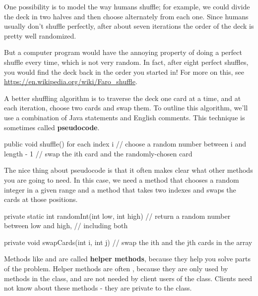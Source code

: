 One possibility is to model the way humans shuffle; for example, we could divide the deck in two halves and then choose alternately from each one.
Since humans usually don't shuffle perfectly, after about seven iterations the order of the deck is pretty well randomized.

But a computer program would have the annoying property of doing a perfect shuffle every time, which is not very random.
In fact, after eight perfect shuffles, you would find the deck back in the order you started in!
For more on this, see \url{https://en.wikipedia.org/wiki/Faro_shuffle}.


A better shuffling algorithm is to traverse the deck one card at a time, and at each iteration, choose two cards and swap them.
To outline this algorithm, we'll use a combination of Java statements and English comments.
This technique is sometimes called {\bf pseudocode}.


\begin{code}
public void shuffle() {
    for each index i {
        // choose a random number between i and length - 1
        // swap the ith card and the randomly-chosen card
    }
}
\end{code}


The nice thing about pseudocode is that it often makes clear what other methods you are going to need.
In this case, we need a method that chooses a random integer in a given range and a method that takes two indexes and swaps the cards at those positions.

\begin{code}
private static int randomInt(int low, int high) {
    // return a random number between low and high, 
    // including both
}

private void swapCards(int i, int j) {
    // swap the ith and the jth cards in the array
}
\end{code}


Methods like  and  are called {\bf helper methods}, because they help you solve parts of the problem.
Helper methods are often , because they are only used by methods in the class, and are not needed by client users of the class. Clients need not know about these methods - they are private to the  class.

